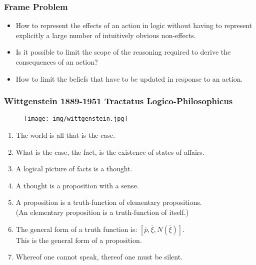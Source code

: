\documentclass[UTF8,11pt,colorlinks,compress,openany]{beamer}%
\begin{document}
\begin{frame}\frametitle{Frame Problem}
\begin{itemize}
	\item How to represent the effects of an action in logic without having to represent explicitly a large number of intuitively obvious non-effects.
	\item Is it possible to limit the scope of the reasoning required to derive the consequences of an action?
	\item How to limit the beliefs that have to be updated in response to an action.
\end{itemize}
\end{frame}

\begin{frame}\frametitle{Wittgenstein 1889-1951 Tractatus Logico-Philosophicus}
\begin{figure}[H]
\texttt{[image: img/wittgenstein.jpg]}
\end{figure}
\begin{enumerate}
	\item The world is all that is the case.
	\item What is the case, the fact, is the existence of states of affairs.
	\item A logical picture of facts is a thought.
	\item A thought is a proposition with a sense.
	\item A proposition is a truth-function of elementary propositions.\\
	(An elementary proposition is a truth-function of itself.)
	\item The general form of a truth function is: $[\overline{p},\overline{\xi},N(\overline{\xi})]$.\\
	This is the general form of a proposition.
	\item Whereof one cannot speak, thereof one must be silent.
\end{enumerate}
\end{frame}
\end{document}
